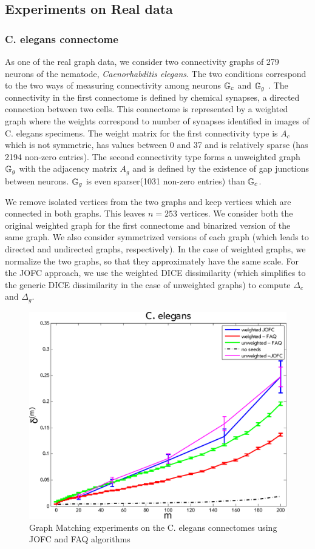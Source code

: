 \documentclass[12pt,oneside,final]{thesis}
\begin{document}
\subsection{Experiments on Real data}

\subsubsection{C. elegans connectome}
As one of the real graph data, we consider two connectivity graphs of 279 neurons of the  nematode, \textit{Caenorhabditis elegans}. The two conditions correspond to the two ways of measuring connectivity among neurons $\mathbb{G}_c$ and $\mathbb{G}_g$ . The connectivity in the first connectome is defined by chemical synapses, a directed connection between two cells. This connectome is represented by a weighted graph where the weights correspond to number of synapses identified in images of C. elegans specimens.  The  weight matrix for the first connectivity type is $A_c$ which is not symmetric, has values between 0 and 37 and is relatively sparse (has 2194 non-zero entries). The second connectivity type forms a unweighted graph $\mathbb{G}_g$ with the adjacency matrix $A_g$ and is defined by the existence of gap junctions between neurons. $\mathbb{G}_g$ is even sparser(1031 non-zero entries) than $\mathbb{G}_c$.

We remove isolated vertices from the two graphs and keep vertices which are connected in both graphs. This leaves $n=253$  vertices. We consider both the original weighted graph for the first connectome and binarized version of the same graph. We  also consider symmetrized versions of each graph (which leads to directed and undirected graphs, respectively). In the case of weighted graphs, we normalize the two graphs, so that they approximately have the same scale. For the JOFC approach, we use the weighted DICE dissimilarity (which simplifies to the generic DICE dissimilarity in the case of unweighted graphs) to compute $\Delta_c$ and $\Delta_g$.   

\begin{figure}
\includegraphics[scale=0.75]{worm_jofc_vs_faq_wt_unwt-crop}
\caption{Graph Matching experiments on the C. elegans connectomes using JOFC and FAQ algorithms \label{worm_graphmatch}}
\end{figure}
\end{document}
